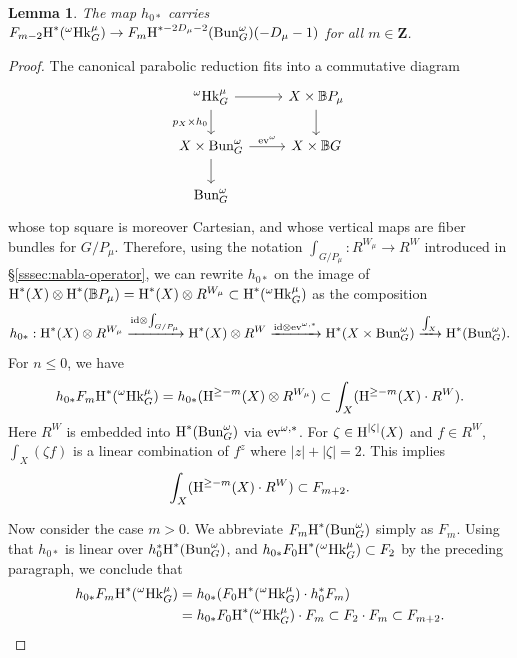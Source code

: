 \documentclass[reqno]{amsart}
\numberwithin{equation}{subsection}
\newtheorem{lemma}[subsubsection]{Lemma}
\theoremstyle{definition}
\def\BB{\mathbb{B}}
\newcommand{\Bun}{\textup{Bun}}
\newcommand\ev{\textup{ev}}
\newcommand\Hk{\mathrm{Hk}}
\newcommand\id{\textup{id}}
\newcommand\upH{\textup{H}}
\newcommand\ot{\otimes}
\newcommand{\cohog}[2]{\textup{H}^{#1}({#2})}     %
\newcommand\xr{\xrightarrow}
\newcommand{\z}{\zeta}
\newcommand{\om}{\omega}
\newcommand{\Z}{\mathbf{Z}}
\begin{document}
\begin{lemma}\label{l:h1 push}
The map $h_{0*}$ carries $F_{m-2}\cohog{*}{{}^{\om} \Hk^{\mu}_G} \rightarrow F_{m}\cohog{*-2D_\mu-2}{\Bun^{\om}_{G}}(-D_\mu-1)$ for all $m\in\Z$.
\end{lemma}
\begin{proof}
The canonical parabolic reduction fits into a commutative diagram
\begin{equation}\label{eq: hecke reduction cartesian}
\begin{tikzcd}
{}^\omega \Hk^\mu_G \ar[r] \ar[d, "p_X \times h_0"'] & X \times \BB P_\mu \ar[d] \\
X \times \Bun_G^{\omega} \ar[r, "{\ev^{\omega}}"]  \ar[d] & X \times \BB G
 \\
\Bun_G^{\omega} 
\end{tikzcd} 
\end{equation}
whose top square is moreover Cartesian, and whose vertical maps are fiber bundles for $G/P_\mu$. Therefore, using the notation $\int_{G/P_{\mu}}: R^{W_{\mu}}\to R^{W}$ introduced in \S\ref{sssec:nabla-operator}, we can rewrite $h_{0*}$ on the image of $\cohog{*}{X} \ot \cohog{*}{\BB P_\mu} = \cohog{*}{X}\ot R^{W_{\mu}}\subset \cohog{*}{{}^{\om} \Hk^{\mu}_G}$ as the composition
\begin{equation}\label{h0 int}
h_{0*}: \cohog{*}{X}\ot R^{W_{\mu}}\xr{\id\ot\int_{G/P_{\mu}}}\cohog{*}{X}\ot R^{W}\xr{\id \ot \ev^{\om, *}} \cohog{*}{X\times \Bun^{\om}_{G}}\xr{\int_{X}}\cohog{*}{\Bun^{\om}_{G}}.
\end{equation}
For $n\le 0$, we have
\begin{equation*}
h_{0*}F_{m}\cohog{*}{{}^{\om} \Hk^{\mu}_G}=h_{0*}(\upH^{\ge -m}(X)\ot R^{W_{\mu}})\subset \int_{X}(\upH^{\ge -m}(X)\cdot R^{W}).
\end{equation*}
Here $R^{W}$ is embedded into $\cohog{*}{\Bun_{G}^{\om}}$ via $\ev^{\om,*}$. For $\z\in \cohog{|\z|}{X}$ and $f\in R^{W}$, $\int_{X}(\z f)$ is a linear combination of $f^{z}$ where $|z|+|\z|=2$. This implies 
\begin{equation*}
\int_{X}(\upH^{\ge -m}(X)\cdot R^{W})\subset F_{m+2}.
\end{equation*}

Now consider the case $m>0$. We abbreviate $F_{m}\cohog{*}{\Bun^{\om}_{G}}$ simply as $F_{m}$.
Using that $h_{0*}$ is linear over $h_{0}^{*}\cohog{*}{\Bun_{G}^{\om}}$, and $h_{0*}F_{0}\cohog{*}{{}^{\om} \Hk^{\mu}_G}\subset F_{2}$ by the preceding paragraph, we conclude that
\begin{align*}
h_{0*}F_{m}\cohog{*}{{}^{\om} \Hk^{\mu}_G}& =h_{0*}(F_{0}\cohog{*}{{}^{\om} \Hk^{\mu}_G}\cdot h_{0}^{*}F_{m}) \\
& =h_{0*}F_{0}\cohog{*}{{}^{\om} \Hk^{\mu}_G}\cdot F_{m}
\subset F_{2}\cdot F_{m}\subset F_{m+2}.
\end{align*}
\end{proof}
\end{document}
